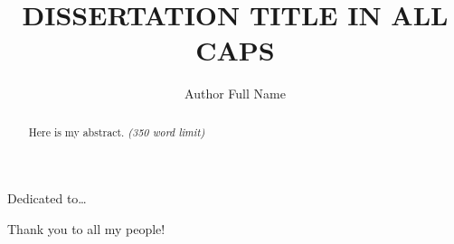 \documentclass[print]{nuthesis}
\begin{document}
\frontmatter
\title{DISSERTATION TITLE IN ALL CAPS}
\author{Author Full Name}
\adviser{}
\adviserAbstract{}
\maketitle


\begin{abstract}
    Here is my abstract. \emph{(350 word limit)}
\end{abstract}


\begin{dedication}
Dedicated to\ldots{}
\end{dedication}

\begin{acknowledgments}
Thank you to all my people!
\end{acknowledgments}


\tableofcontents

\listoffigures
\listoftables

\mainmatter
\end{document}
